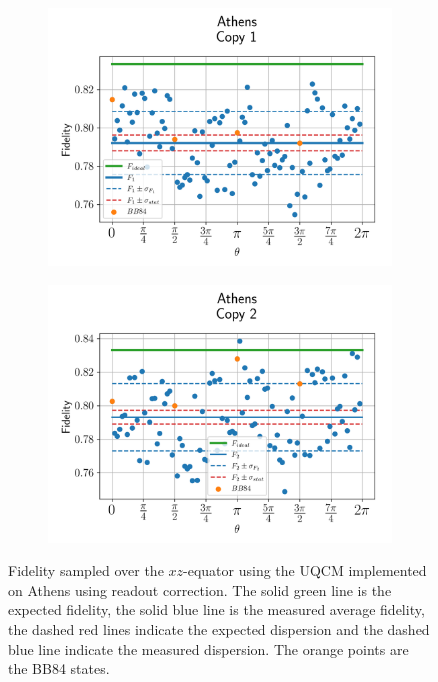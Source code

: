 \begin{figure}[H]
    \centering
    \begin{subfigure}{.45\textwidth}
      \centering
      \includegraphics[width=\textwidth]{Figures/UQCM/IBM/OnlyEquator/results_corrected_athens_copy1.png}
    \end{subfigure}%
    \begin{subfigure}{.45\textwidth}
      \centering
      \includegraphics[width=\textwidth]{Figures/UQCM/IBM/OnlyEquator/results_corrected_athens_copy2.png}
    \end{subfigure}
    \caption{Fidelity sampled over the $xz$-equator using the UQCM implemented on Athens using readout correction. The solid green line is the expected fidelity, the solid blue line is the measured average fidelity, the dashed red lines indicate the expected dispersion and the dashed blue line indicate the measured dispersion. The orange points are the BB84 states.}
    \label{fig:uqcm_eq_athens}
\end{figure}


